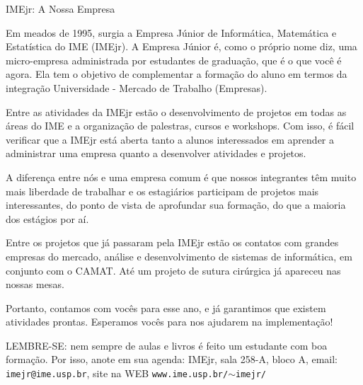 \begin{secao}{IMEjr: A Nossa Empresa}

Em meados de 1995, surgia a Empresa Júnior de Informática, Matemática
e Estatística do IME (IMEjr). A Empresa Júnior é, como o próprio nome
diz, uma micro-empresa administrada por estudantes de graduação, que é
o que você é agora. Ela tem o objetivo de complementar a formação do
aluno em termos da integração Universidade - Mercado de Trabalho
(Empresas).


Entre as atividades da IMEjr estão o desenvolvimento de
projetos em todas as áreas do IME e a organização de palestras, cursos
e workshops. Com isso, é fácil verificar que a IMEjr está aberta tanto
a alunos interessados em aprender a administrar uma empresa quanto a
desenvolver atividades e projetos.

A diferença entre nós e uma
empresa comum é que nossos integrantes têm muito mais liberdade de
trabalhar e os estagiários participam de projetos mais interessantes,
do ponto de vista de aprofundar sua formação, do que a maioria dos
estágios por aí.

Entre os projetos que já passaram pela IMEjr estão
os contatos com grandes empresas do mercado, análise e desenvolvimento
de sistemas de informática,  em conjunto com o CAMAT. Até um projeto
de sutura cirúrgica já apareceu nas nossas mesas.

Portanto, contamos
com vocês para esse ano, e já garantimos que existem atividades
prontas. Esperamos vocês para nos ajudarem na implementação!

LEMBRE-SE: nem sempre de aulas e livros é feito um estudante com boa
formação. Por isso, anote em sua agenda: IMEjr, sala 258-A, bloco A,
email: {\tt imejr@ime.usp.br}, site na WEB
{\tt www.ime.usp.br/$\sim$imejr/}

\end{secao}
